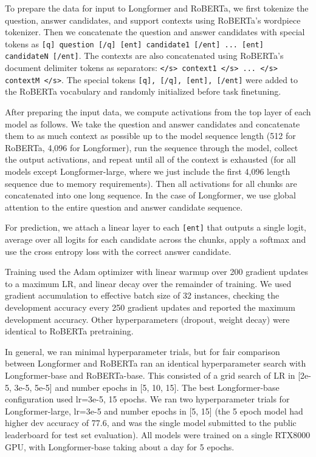 \documentclass[11pt,a4paper]{article}
\newcommand{\model}{Longformer\xspace}
\begin{document}
To prepare the data for input to \model and RoBERTa, we first tokenize the question, answer candidates, and support contexts using RoBERTa's wordpiece tokenizer.  Then we concatenate the question and answer candidates with special tokens as \texttt{[q] question [/q] [ent] candidate1 [/ent] ... [ent] candidateN [/ent]}.  The contexts are also concatenated using RoBERTa's document delimiter tokens as separators: \texttt{</s> context1 </s> ... </s> contextM </s>}.  The special tokens \texttt{[q], [/q], [ent], [/ent]} were added to the RoBERTa vocabulary and randomly initialized before task finetuning.

After preparing the input data, we compute activations from the top layer of each model as follows.
We take the question and answer candidates and concatenate them to as much context as possible up to the model sequence length (512 for RoBERTa, 4,096 for \model), run the sequence through the model, collect the output activations, and repeat until all of the context is exhausted (for all models except \model-large, where we just include the first 4,096 length sequence due to memory requirements).  Then all activations for all chunks are concatenated into one long sequence.  In the case of \model, we use global attention to the entire question and answer candidate sequence.

For prediction, we attach a linear layer to each \texttt{[ent]} that outputs a single logit, average over all logits for each candidate across the chunks, apply a softmax and use the cross entropy loss with the correct answer candidate.

Training used the Adam optimizer with linear warmup over 200 gradient updates to a maximum LR, and linear decay over the remainder of training.  We used gradient accumulation to effective batch size of 32 instances, checking the development accuracy every 250 gradient updates and reported the maximum development accuracy.  Other hyperparameters (dropout, weight decay) were identical to RoBERTa pretraining.

In general, we ran minimal hyperparameter trials, but for fair comparison between \model and RoBERTa ran an identical hyperparameter search with \model-base and RoBERTa-base.  This consisted of a grid search of LR in [2e-5, 3e-5, 5e-5] and number epochs in [5, 10, 15].  The best \model-base configuration used lr=3e-5, 15 epochs.  We ran two hyperparameter trials for \model-large, lr=3e-5 and number epochs in [5, 15] (the 5 epoch model had higher dev accuracy of 77.6, and was the single model submitted to the public leaderboard for test set evaluation).  All models were trained on a single RTX8000 GPU, with \model-base taking about a day for 5 epochs.
\end{document}
